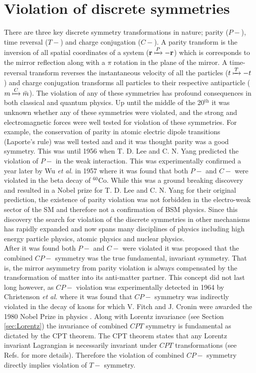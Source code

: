 \documentclass[10pt,a4paper, twoside, openright]{report}
\begin{document}
\section{Violation of discrete symmetries}
There are three key discrete symmetry transformations in nature; parity ($P-$), time reversal ($T-$) and charge conjugation ($C-$). A parity transform is the inversion of all spatial coordinates of a system ($\textbf{r} \xmapsto{P} -\textbf{r}$) which is corresponds to the mirror reflection along with a $\pi$ rotation in the plane of the mirror. A time-reversal transform reverses the instantaneous velocity of all the particles ($t \xmapsto{T} -t$) and charge conjugation transforms all particles to their respective antiparticle ($m \xmapsto{C} \bar{m}$). The violation of any of these symmetries has profound consequences in both classical and quantum physics. Up until the middle of the 20$^{\text{th}}$ it was unknown whether any of these symmetries were violated, and the strong and electromagnetic forces were well tested for violation of these symmetries.  For example, the conservation of parity in atomic electric dipole transitions (Laporte's rule) was well tested and and it was thought parity was a good symmetry. This was until 1956 when T. D. Lee and C. N. Yang predicted the violation of $P-$ in the weak interaction\cite{Yang1956}.  This was experimentally confirmed a year later  by Wu \textit{et al.} in 1957 \cite{Wu1957} where it was found that both $P-$ and $C-$ were violated in the beta decay of $^{60}$Co. While this was a ground breaking discovery and resulted in a Nobel prize for  T. D. Lee and C. N. Yang for their original prediction, the existence of parity violation was not forbidden in the electro-weak sector of the SM and therefore not a confirmation of BSM physics.   Since this discovery the search for violation of the discrete symmetries in other mechanisms has rapidly expanded and now spans many disciplines of physics including high energy particle physics, atomic physics and nuclear physics. \\
\linebreak
After it was found both $P-$ and $C-$ were violated it was proposed that the combined $CP-$ symmetry was the true fundamental, invariant symmetry. That is, the mirror asymmetry from parity violation is always compensated by the transformation of matter into its anti-matter partner.  This concept did not last long however, as  $CP-$ violation was experimentally detected in 1964 by Christenson \textit{et al.} \cite{Christenson1964} where it was found that $CP-$ symmetry was indirectly violated in the decay of kaons for which V. Fitch and J. Cronin  were awarded the 1980 Nobel Prize in physics \cite{Cronin1981}. Along with Lorentz invariance (see Section \ref{sec:Lorentz}) the invariance of combined $CPT$ symmetry is fundamental as dictated by the CPT theorem. The CPT theorem states that any Lorentz invariant Lagrangian is necessarily invariant under $CPT$ transformations (see Refs. \cite{LandauVol4, KhriplovichCP, HenleyCP} for more details). Therefore the violation of combined $CP-$ symmetry directly implies violation of $T-$ symmetry. \\
\end{document}
